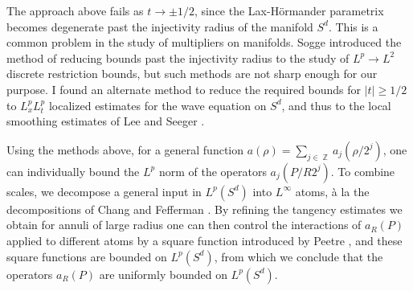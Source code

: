 \documentclass[11pt]{article}
\DeclareMathOperator{\ZZ}{\mathbb{Z}}
\begin{document}
The approach above fails as $t \to \pm 1/2$, since the Lax-H\"{o}rmander parametrix becomes degenerate past the injectivity radius of the manifold $S^d$. This is a common problem in the study of multipliers on manifolds. Sogge \cite{SoggeRieszMeans} introduced the method of reducing bounds past the injectivity radius to the study of $L^p \to L^2$ discrete restriction bounds, but such methods are not sharp enough for our purpose. I found an alternate method to reduce the required bounds for $|t| \geq 1/2$ to $L^p_x L^p_t$ localized estimates
for the wave equation on $S^d$, and thus to the local smoothing estimates of Lee and Seeger \cite{LeeSeeger}.

Using the methods above, for a general function $a(\rho) = \sum_{j \in \ZZ} a_j(\rho / 2^j)$, one can individually bound the $L^p$ norm of the operators $a_j(P/ R 2^j)$. To combine scales, we decompose a general input in $L^p(S^d)$ into $L^\infty$ atoms, à la the decompositions of Chang and Fefferman \cite{ChangFefferman}. By refining the tangency estimates we obtain for annuli of large radius one can then control the interactions of $a_R(P)$ applied to different atoms by a square function introduced by Peetre \cite{Peetre}, and these square functions are bounded on $L^p(S^d)$, from which we conclude that the operators $a_R(P)$ are uniformly bounded on $L^p(S^d)$.



\end{document}
